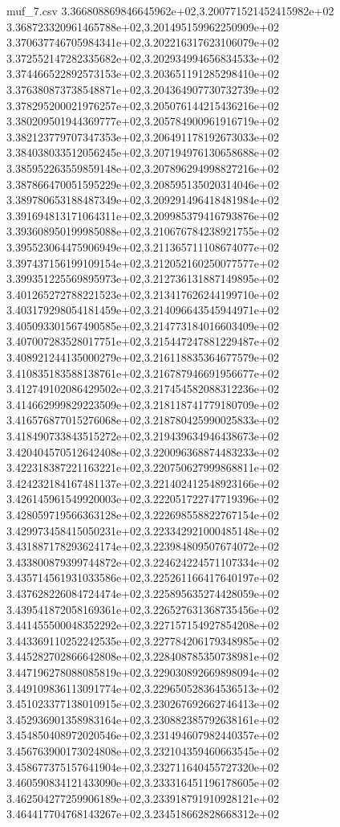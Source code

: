 \begin{filecontents*}{muf_7.csv}
3.366808869846645962e+02,3.200771521452415982e+02
3.368723320961465788e+02,3.201495159962250909e+02
3.370637746705984341e+02,3.202216317623106079e+02
3.372552147282335682e+02,3.202934994656834533e+02
3.374466522892573153e+02,3.203651191285298410e+02
3.376380873738548871e+02,3.204364907730732739e+02
3.378295200021976257e+02,3.205076144215436216e+02
3.380209501944369777e+02,3.205784900961916719e+02
3.382123779707347353e+02,3.206491178192673033e+02
3.384038033512056245e+02,3.207194976130658688e+02
3.385952263559859148e+02,3.207896294998827216e+02
3.387866470051595229e+02,3.208595135020314046e+02
3.389780653188487349e+02,3.209291496418481984e+02
3.391694813171064311e+02,3.209985379416793876e+02
3.393608950199985088e+02,3.210676784238921755e+02
3.395523064475906949e+02,3.211365711108674077e+02
3.397437156199109154e+02,3.212052160250077577e+02
3.399351225569895973e+02,3.212736131887149895e+02
3.401265272788221523e+02,3.213417626244199710e+02
3.403179298054181459e+02,3.214096643545944971e+02
3.405093301567490585e+02,3.214773184016603409e+02
3.407007283528017751e+02,3.215447247881229487e+02
3.408921244135000279e+02,3.216118835364677579e+02
3.410835183588138761e+02,3.216787946691956677e+02
3.412749102086429502e+02,3.217454582088312236e+02
3.414662999829223509e+02,3.218118741779180709e+02
3.416576877015276068e+02,3.218780425990025833e+02
3.418490733843515272e+02,3.219439634946438673e+02
3.420404570512642408e+02,3.220096368874483233e+02
3.422318387221163221e+02,3.220750627999868811e+02
3.424232184167481137e+02,3.221402412548923166e+02
3.426145961549920003e+02,3.222051722747719396e+02
3.428059719566363128e+02,3.222698558822767154e+02
3.429973458415050231e+02,3.223342921000485148e+02
3.431887178293624174e+02,3.223984809507674072e+02
3.433800879399744872e+02,3.224624224571107334e+02
3.435714561931033586e+02,3.225261166417640197e+02
3.437628226084724474e+02,3.225895635274428059e+02
3.439541872058169361e+02,3.226527631368735456e+02
3.441455500048352292e+02,3.227157154927854208e+02
3.443369110252242535e+02,3.227784206179348985e+02
3.445282702866642808e+02,3.228408785350738981e+02
3.447196278088085819e+02,3.229030892669898094e+02
3.449109836113091774e+02,3.229650528364536513e+02
3.451023377138010915e+02,3.230267692662746413e+02
3.452936901358983164e+02,3.230882385792638161e+02
3.454850408972020546e+02,3.231494607982440357e+02
3.456763900173024808e+02,3.232104359460663545e+02
3.458677375157641904e+02,3.232711640455727320e+02
3.460590834121433090e+02,3.233316451196178605e+02
3.462504277259906189e+02,3.233918791910928121e+02
3.464417704768143267e+02,3.234518662828668312e+02

\end{filecontents*}
